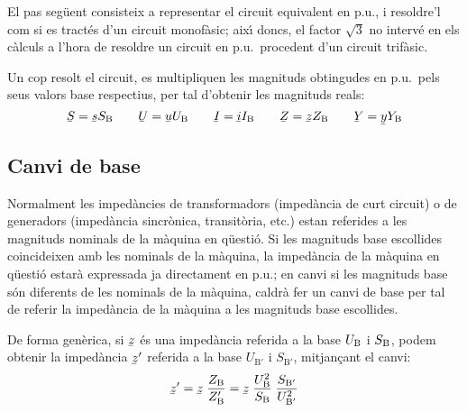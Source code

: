 El pas seg\"{u}ent consisteix a representar el circuit equivalent en
p.u., i resoldre'l com si es tract\'{e}s d'un circuit monof\`{a}sic; aix\'{\i}
doncs, el factor $\sqrt{3}$ no interv\'{e} en els c\`{a}lculs a l'hora de
resoldre un circuit en p.u.\ procedent d'un circuit trif\`{a}sic.

Un cop resolt el circuit, es multipliquen les magnituds obtingudes en p.u.\ pels
seus valors base respectius, per tal d'obtenir les magnituds reals:
\begin{equation}
   \cmplx{S} = \cmplx{s} S\ped{B} \qquad \cmplx{U} = \cmplx{u} U\ped{B} \qquad \cmplx{I} = \cmplx{i} I\ped{B} \qquad \cmplx{Z} = \cmplx{z} Z\ped{B} \qquad \cmplx{Y} = \cmplx{y} Y\ped{B}
\end{equation}

\subsection{Canvi de base} 

Normalment les imped\`{a}ncies de transformadors (imped\`{a}ncia de curt circuit) o de generadors (imped\`{a}ncia sincr\`{o}nica, transit\`{o}ria, etc.) estan referides a les magnituds nominals de la m\`{a}quina en q\"{u}esti\'{o}. Si les magnituds base escollides coincideixen amb les nominals de la m\`{a}quina,
la imped\`{a}ncia de la m\`{a}quina en q\"{u}esti\'{o} estar\`{a} expressada ja directament en p.u.; en canvi si les magnituds base s\'{o}n diferents de les nominals de la m\`{a}quina, caldr\`{a} fer un canvi de base per tal de referir la imped\`{a}ncia de la m\`{a}quina a les magnituds base escollides.

De forma gen\`{e}rica, si $\cmplx{z}$ \'{e}s una imped\`{a}ncia referida a la base $U_\mathrm{B}$ i $S_\mathrm{B}$, podem obtenir la imped\`{a}ncia $\cmplx{z}'$ referida a la base $U_{\text{B}'}$ i $S_{\text{B}'}$, mitjan\c{c}ant el canvi:
\begin{equation}
   \cmplx{z}' = \cmplx{z} \; \frac{Z\ped{B}}{Z\ped{B}'} = \cmplx{z} \; \frac{U\ped{B}^2}{S\ped{B}} \; \frac{S_{\text{B}'}}{U_{\text{B}'}^2}
\end{equation}

